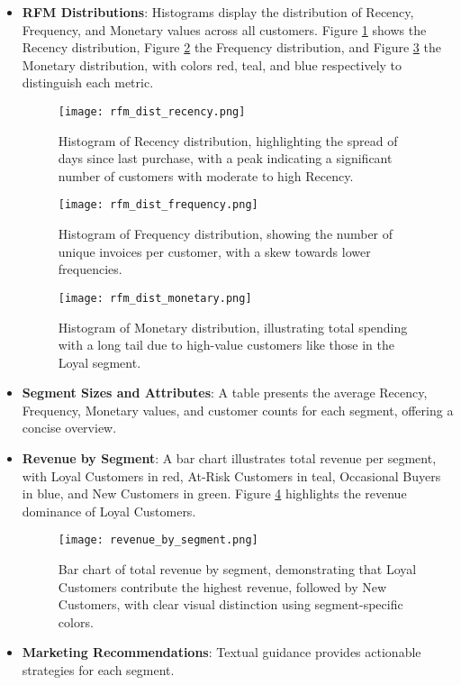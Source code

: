 \documentclass[a4paper,12pt]{article}
\begin{document}
\begin{itemize}
    \item \textbf{RFM Distributions}: Histograms display the distribution of Recency, Frequency, and Monetary values across all customers. Figure \ref{fig:rfm_recency} shows the Recency distribution, Figure \ref{fig:rfm_frequency} the Frequency distribution, and Figure \ref{fig:rfm_monetary} the Monetary distribution, with colors red, teal, and blue respectively to distinguish each metric.

    \begin{figure}[H]
        \centering
        \texttt{[image: rfm\_dist\_recency.png]}
        \caption{Histogram of Recency distribution, highlighting the spread of days since last purchase, with a peak indicating a significant number of customers with moderate to high Recency.}
        \label{fig:rfm_recency}
    \end{figure}

    \begin{figure}[H]
        \centering
        \texttt{[image: rfm\_dist\_frequency.png]}
        \caption{Histogram of Frequency distribution, showing the number of unique invoices per customer, with a skew towards lower frequencies.}
        \label{fig:rfm_frequency}
    \end{figure}

    \begin{figure}[H]
        \centering
        \texttt{[image: rfm\_dist\_monetary.png]}
        \caption{Histogram of Monetary distribution, illustrating total spending with a long tail due to high-value customers like those in the Loyal segment.}
        \label{fig:rfm_monetary}
    \end{figure}

    \item \textbf{Segment Sizes and Attributes}: A table presents the average Recency, Frequency, Monetary values, and customer counts for each segment, offering a concise overview.

    \item \textbf{Revenue by Segment}: A bar chart illustrates total revenue per segment, with Loyal Customers in red, At-Risk Customers in teal, Occasional Buyers in blue, and New Customers in green. Figure \ref{fig:revenue_segment} highlights the revenue dominance of Loyal Customers.

    \begin{figure}[H]
        \centering
        \texttt{[image: revenue\_by\_segment.png]}
        \caption{Bar chart of total revenue by segment, demonstrating that Loyal Customers contribute the highest revenue, followed by New Customers, with clear visual distinction using segment-specific colors.}
        \label{fig:revenue_segment}
    \end{figure}

    \item \textbf{Marketing Recommendations}: Textual guidance provides actionable strategies for each segment.
\end{itemize}
\end{document}
